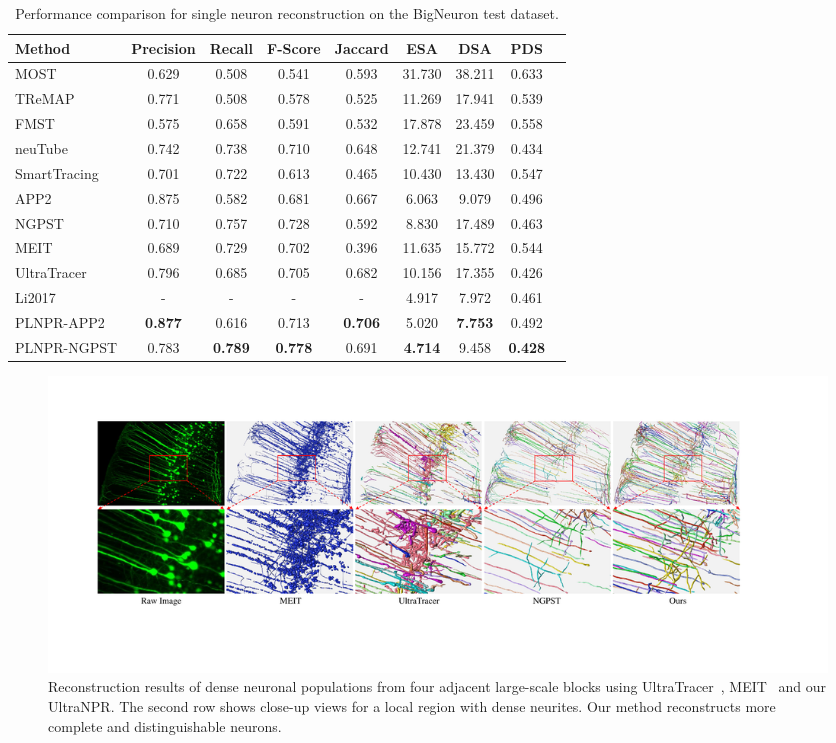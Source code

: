 \begin{table}[h]
	\centering
	\makeatletter{}\makeatother
	\caption{Performance comparison for single neuron reconstruction on the BigNeuron test dataset.}
	\label{table:compare_BigNeuron}
	\begin{tabular}{lcccccccc}
		\toprule
		Method & Precision & Recall & F-Score & Jaccard & ESA & DSA & PDS\\
		\midrule
		MOST~\cite{Wu2014} & 0.629 & 0.508 & 0.541 & 0.593 & 31.730 & 38.211 & 0.633\\
		TReMAP~\cite{Zhou2016} & 0.771 & 0.508 & 0.578 & 0.525 & 11.269 & 17.941 & 0.539\\
		FMST~\cite{Yang2019} & 0.575 & 0.658 & 0.591 & 0.532 & 17.878 & 23.459 & 0.558\\
		neuTube~\cite{Feng2015} & 0.742&0.738&0.710&0.648&12.741&21.379&0.434&\\
		SmartTracing~\cite{Chen2015} & 0.701 & 0.722 & 0.613 & 0.465 & 10.430 & 13.430 & 0.547\\
		APP2~\cite{Xiao2013} & 0.875 & 	0.582 & 0.681 & 0.667 & 6.063 & 9.079 & 0.496\\
		NGPST~\cite{Quan2015} & 0.710 & 0.757 & 0.728 & 0.592 & 8.830 & 17.489 & 0.463\\
		MEIT~\cite{Wang2018} & 0.689  & 0.729 & 0.702 & 0.396 & 11.635 &15.772 & 0.544 \\
		UltraTracer~\cite{Peng2017} & 0.796 & 0.685 & 0.705 & 0.682 & 10.156 & 17.355 & 0.426 \\
		Li2017~\cite{Li2017} & - & - & - & - & 4.917 & 7.972 &0.461 \\
		\midrule
		PLNPR-APP2 & \textbf{0.877} & 0.616 & 0.713 & \textbf{0.706} & 5.020 & \textbf{7.753} & 0.492\\
		PLNPR-NGPST &0.783&\textbf{0.789}&\textbf{0.778}&0.691&\textbf{4.714}&9.458 & \textbf{0.428}\\
		\bottomrule
	\end{tabular}
\end{table}

\begin{figure}[t]
	\centering
	\includegraphics[width=\textwidth]{./Illustrations/comparison_ultranpr.pdf}
	\caption{Reconstruction results of dense neuronal populations from four adjacent large-scale blocks using UltraTracer~\cite{Peng2017}, MEIT~\cite{Wang2018} and our UltraNPR. The second row shows close-up views for a local region with dense neurites. Our method reconstructs more complete and distinguishable neurons. 
	}
	\label{fig:reconstruct_blocks}
\end{figure}

